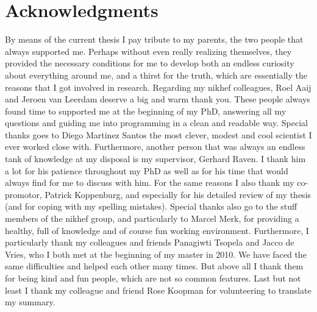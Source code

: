 \chapter*{Acknowledgments}
\chaptermark{}

By means of the current thesis I pay tribute to my parents, the two people that always
supported me. Perhaps without even really realizing themselves, they provided the necessary conditions
for me to develop both an endless curiosity about everything around me, and a thirst for the truth,
which are essentially the reasons that I got involved in research. Regarding my nikhef colleagues,
Roel Aaij and Jeroen van Leerdam deserve a big and warm thank you. These people always found time to
supported me at the beginning of my PhD, answering all my questions and guiding me into programming in
a clean and readable way. Special thanks goes to Diego Martinez Santos the most clever, modest
and cool scientist I ever worked close with. Furthermore, another person that was always an endless
tank of knowledge at my disposal is my supervisor, Gerhard Raven. I thank him a lot for his patience
throughout my PhD as well as for his time that would always find for me to discuss with him.
For the same reasons I also thank my co-promotor, Patrick Koppenburg, and especially for his detailed
review of my thesis (and for coping with my spelling mistakes). Special thanks also go to the stuff
members of the nikhef \lhcb group, and particularly to Marcel Merk, for providing a healthy, full
of knowledge and of course fun working environment. Furthermore, I particularly thank my colleagues and
friends Panagiwti Tsopela and Jacco de Vries, who I both met at the beginning of my master in 2010.
We have faced the same difficulties and helped each other many times. But above all I thank them for
being kind and fun people, which are not so common features. Last but not least I thank my colleague
and friend Rose Koopman for volunteering to translate my summary.
